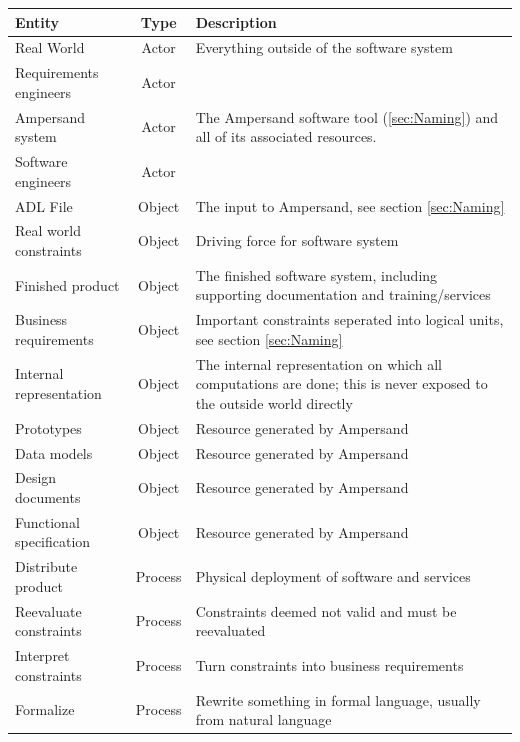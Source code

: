 \documentclass[12pt]{report}
\begin{document}
\begin{tabularx}{1.2\textwidth}{lcX}
\caption{Description of entities present in figure \ref{fig:BusinessProcess}}\\
\toprule
\textbf{Entity} & \textbf{Type} & \textbf{Description} \\[6pt] 
\midrule
\endhead

Real World & Actor & Everything outside of the software system \\[6pt]
Requirements engineers & Actor & \\[6pt]
Ampersand system & Actor & The Ampersand software tool (\ref{sec:Naming}) and
  all of its associated resources. \\[6pt]
Software engineers & Actor & \\[6pt]
ADL File        & Object        & The input to Ampersand, see section \ref{sec:Naming} \\[6pt] 
Real world constraints  & Object & Driving force for software system \\[6pt] 
Finished product  & Object & The finished software system, including supporting documentation and training/services  \\[6pt] 
Business requirements & Object & Important constraints seperated into logical units, see section \ref{sec:Naming} \\[6pt] 
Internal representation & Object & The internal representation on which all
  computations are done; this is never exposed to the outside world directly \\[6pt]
Prototypes & Object & Resource generated by Ampersand \\[6pt]
Data models & Object & Resource generated by Ampersand \\[6pt]
Design documents & Object & Resource generated by Ampersand \\[6pt]
Functional specification & Object & Resource generated by Ampersand \\[6pt]
Distribute product & Process & Physical deployment of software and services \\[6pt]
Reevaluate constraints & Process & Constraints deemed not valid and must be reevaluated \\[6pt]
Interpret constraints & Process & Turn constraints into business requirements \\[6pt]
Formalize & Process & Rewrite something in formal language, usually from natural language \\[6pt]

\end{tabularx}
\end{document}
